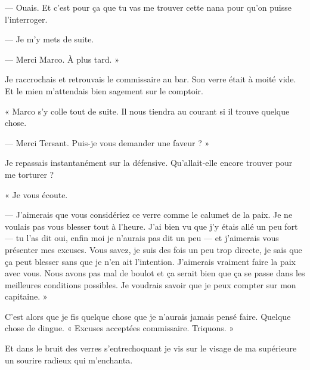 — Ouais. Et c'est pour ça que tu vas me trouver cette nana pour qu'on puisse l'interroger.

— Je m'y mets de suite. 

— Merci Marco. À plus tard. »

Je raccrochais et retrouvais le commissaire au bar. Son verre était à moité vide. Et le mien m'attendais bien sagement 
sur le comptoir.

« Marco s'y colle tout de suite. Il nous tiendra au courant si il trouve quelque chose.

— Merci Tersant. Puis-je vous demander une faveur ? »

Je repassais instantanément sur la défensive. Qu'allait-elle encore trouver pour me torturer ?

« Je vous écoute.

— J'aimerais que vous considériez ce verre comme le calumet de la paix. Je ne voulais pas vous blesser tout à l'heure. 
J'ai bien vu que j'y étais allé un peu fort — tu l'as dit oui, enfin moi je n'aurais pas dit un peu — et j'aimerais 
vous présenter mes excuses. Vous savez, je suis des fois un peu trop directe, je sais que ça peut blesser sans que je 
n'en ait l'intention. J'aimerais vraiment faire la paix avec vous. Nous avons pas mal de boulot et ça serait bien 
que ça se passe dans les meilleures conditions possibles. Je voudrais savoir que je peux compter sur mon capitaine. »

C'est alors que je fis quelque chose que je n'aurais jamais pensé faire. Quelque chose de dingue. « Excuses acceptées 
commissaire. Triquons. »

Et dans le bruit des verres s'entrechoquant je vis sur le visage de ma supérieure un sourire radieux qui m'enchanta.